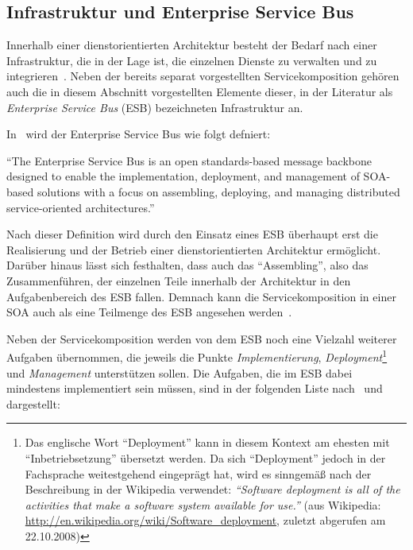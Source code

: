 
\subsection{Infrastruktur und Enterprise Service Bus} %
\label{sub:infrastruktur}

  Innerhalb einer dienstorientierten Architektur besteht der Bedarf nach einer Infrastruktur, die in der Lage ist, die einzelnen Dienste zu verwalten und zu integrieren~\citep[S. 270]{web_services_principles_and_technology}. Neben der bereits separat vorgestellten Servicekomposition gehören auch die in diesem Abschnitt vorgestellten Elemente dieser, in der Literatur als \emph{Enterprise Service Bus} (ESB) bezeichneten Infrastruktur an.
  
  In~\citep{web_services_principles_and_technology} wird der Enterprise Service Bus wie folgt defniert:
  
  \begin{definition}[ESB]\label{def:enterprise_serivce_bus}
    "`The Enterprise Service Bus is an open standards-based message backbone designed to enable the implementation, deployment, and management of SOA-based solutions with a focus on assembling, deploying, and managing distributed service-oriented architectures."'~\emph{\citep[S. 270]{web_services_principles_and_technology}}
  \end{definition}
  
  Nach dieser Definition wird durch den Einsatz eines ESB überhaupt erst die Realisierung und der Betrieb einer dienstorientierten Architektur ermöglicht. Darüber hinaus lässt sich festhalten, dass auch das "`Assembling"', also das Zusammenführen, der einzelnen Teile innerhalb der Architektur in den Aufgabenbereich des ESB fallen. Demnach kann die Servicekomposition in einer SOA auch als eine Teilmenge des ESB angesehen werden~\citep[S. 3]{enterprise_service_bus}.

  Neben der Servicekomposition werden von dem ESB noch eine Vielzahl weiterer Aufgaben übernommen, die jeweils die Punkte \emph{Implementierung}, \emph{Deployment}\footnote{Das englische Wort "`Deployment"' kann in diesem Kontext am ehesten mit "`Inbetriebsetzung"' übersetzt werden. Da sich "`Deployment"' jedoch in der Fachsprache weitestgehend eingeprägt hat, wird es sinngemäß nach der Beschreibung in der Wikipedia verwendet: \emph{"`Software deployment is all of the activities that make a software system available for use."'} (aus Wikipedia: \url{http://en.wikipedia.org/wiki/Software_deployment}, zuletzt abgerufen am 22.10.2008)} und \emph{Management} unterstützen sollen. Die Aufgaben, die im ESB dabei mindestens implementiert sein müssen, sind in der folgenden Liste nach~\citep[S. 137]{soa_goes_real} und~\citep[S. 146]{masak2007ssb} dargestellt:
  
